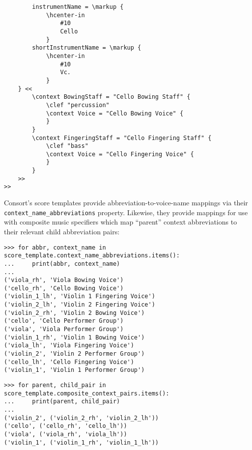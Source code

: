 \begin{abjadbookoutput}
\begin{singlespacing}
\begin{verbatim}
        instrumentName = \markup {
            \hcenter-in
                #10
                Cello
            }
        shortInstrumentName = \markup {
            \hcenter-in
                #10
                Vc.
            }
    } <<
        \context BowingStaff = "Cello Bowing Staff" {
            \clef "percussion"
            \context Voice = "Cello Bowing Voice" {
            }
        }
        \context FingeringStaff = "Cello Fingering Staff" {
            \clef "bass"
            \context Voice = "Cello Fingering Voice" {
            }
        }
    >>
>>
\end{verbatim}
\end{singlespacing}
\end{abjadbookoutput}

\noindent Consort's score templates provide abbreviation-to-voice-name mappings
via their \texttt{context\_name\_abbreviations} property. Likewise, they
provide mappings for use with composite music specifiers which map
\enquote{parent} context abbreviations to their relevant child abbreviation
pairs:

\begin{comment}
<abjad>
for abbr, context_name in score_template.context_name_abbreviations.items():
    print(abbr, context_name)

for parent, child_pair in score_template.composite_context_pairs.items():
    print(parent, child_pair)

</abjad>
\end{comment}

\begin{abjadbookoutput}
\begin{singlespacing}
\vspace{-0.5\baselineskip}
\begin{verbatim}
>>> for abbr, context_name in score_template.context_name_abbreviations.items():
...     print(abbr, context_name)
...
('viola_rh', 'Viola Bowing Voice')
('cello_rh', 'Cello Bowing Voice')
('violin_1_lh', 'Violin 1 Fingering Voice')
('violin_2_lh', 'Violin 2 Fingering Voice')
('violin_2_rh', 'Violin 2 Bowing Voice')
('cello', 'Cello Performer Group')
('viola', 'Viola Performer Group')
('violin_1_rh', 'Violin 1 Bowing Voice')
('viola_lh', 'Viola Fingering Voice')
('violin_2', 'Violin 2 Performer Group')
('cello_lh', 'Cello Fingering Voice')
('violin_1', 'Violin 1 Performer Group')
\end{verbatim}
\begin{verbatim}
>>> for parent, child_pair in score_template.composite_context_pairs.items():
...     print(parent, child_pair)
...
('violin_2', ('violin_2_rh', 'violin_2_lh'))
('cello', ('cello_rh', 'cello_lh'))
('viola', ('viola_rh', 'viola_lh'))
('violin_1', ('violin_1_rh', 'violin_1_lh'))
\end{verbatim}
\end{singlespacing}
\end{abjadbookoutput}


